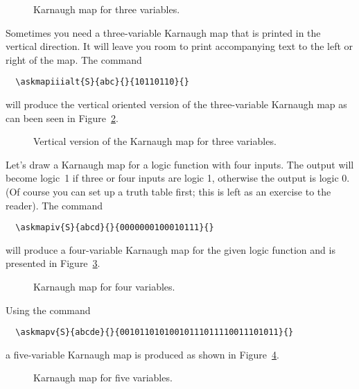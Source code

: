 \documentclass[a4paper,10pt]{ltxdoc}
\begin{document}
\begin{figure}[H]
\centering
\askmapunitlength=0.88cm
%
\caption{Karnaugh map for three variables.}
\label{fig:askmapiii}
\end{figure}

Sometimes you need a three-variable Karnaugh map that is printed in the
vertical direction. It will leave you room to print accompanying text to
the left or right of the map. The command

\begin{verbatim}
  \askmapiiialt{S}{abc}{}{10110110}{}
\end{verbatim}
will produce the vertical oriented version of the three-variable Karnaugh map
as can been seen in Figure~\ref{fig:askmapiiialt}.

\begin{figure}[H]
\centering
\askmapunitlength=0.88cm
%
\caption{Vertical version of the Karnaugh map for three variables.}
\label{fig:askmapiiialt}
\end{figure}

Let's draw a Karnaugh map for a logic function with four inputs.
The output will become logic~1 if three or four inputs are logic 1, otherwise
the output is logic 0. (Of course you can set up a truth table first; this is
left as an exercise to the reader).
The command 
\begin{verbatim}
  \askmapiv{S}{abcd}{}{0000000100010111}{}
\end{verbatim}
will produce a four-variable Karnaugh map for the given logic function and is
presented in Figure~\ref{fig:askmapiv}.

\begin{figure}[H]
\centering
\askmapunitlength=0.88cm
\caption{Karnaugh map for four variables.}
\label{fig:askmapiv}
\end{figure}

Using the command
\begin{verbatim}
  \askmapv{S}{abcde}{}{00101101010010111011110011101011}{}
\end{verbatim}
a five-variable Karnaugh map is produced as shown in Figure~\ref{fig:askmapv}.

\begin{figure}[H]
\centering
\askmapunitlength=0.88cm
\caption{Karnaugh map for five variables.}
\label{fig:askmapv}
\end{figure}
\end{document}
